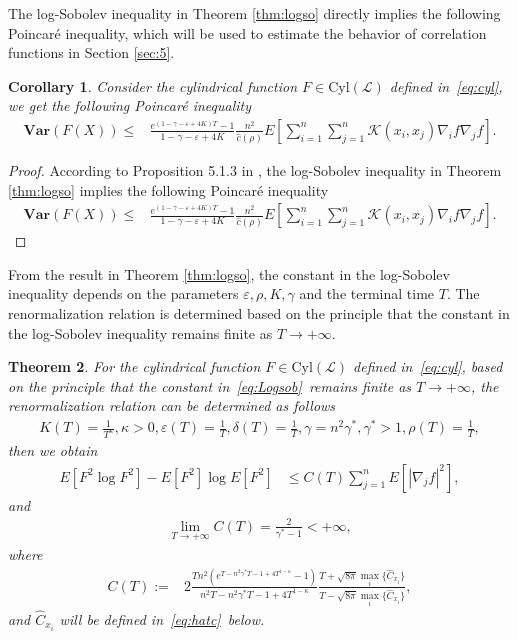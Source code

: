 \documentclass[11pt]{article}
\numberwithin{equation}{section}%
\numberwithin{figure}{section}%
\newtheorem{theorem}{Theorem}[section]
\newtheorem{corollary}[theorem]{Corollary}
\theoremstyle{remark}
\begin{document}
	The log-Sobolev inequality in Theorem \ref{thm:logso} directly implies the following Poincar\'e inequality, which will be used to estimate the behavior of correlation functions in Section \ref{sec:5}.
	\begin{corollary}\label{cor:poinc}
	Consider the cylindrical function $F\in\text{Cyl}(\mathcal{L})$  defined in~\eqref{eq:cyl}, we get the following Poincar\'e inequality
	\begin{align}\label{eq:poin}
		\textbf{Var}(F(X))\leq& \frac{e^{(1-\gamma-\varepsilon+4K)T}-1}{1-\gamma-\varepsilon+4K}\frac{n^{2}}{\hat{c}(\rho)}E\left[\sum_{i=1}^{n}\sum_{j=1}^{n}\mathcal{K}(x_{i},x_{j})\nabla_{i}f\nabla_{j}f\right].
	\end{align}
\end{corollary}
\begin{proof}
	According to Proposition 5.1.3 in \cite{Bakry2014document}, the log-Sobolev inequality in Theorem \ref{thm:logso} implies the following Poincar\'e inequality 
\begin{align*}
	\textbf{Var}(F(X))\leq& \frac{e^{(1-\gamma-\varepsilon+4K)T}-1}{1-\gamma-\varepsilon+4K}\frac{n^{2}}{\hat{c}(\rho)}E\left[\sum_{i=1}^{n}\sum_{j=1}^{n}\mathcal{K}(x_{i},x_{j})\nabla_{i}f\nabla_{j}f\right].
\end{align*}
\end{proof}
From the result in Theorem \ref{thm:logso}, the constant in the log-Sobolev inequality depends on the parameters $\varepsilon,\rho,K,\gamma$ and the terminal time $T$. The renormalization relation is determined based on the  principle that the constant in the log-Sobolev inequality remains finite as $T\rightarrow+\infty$.
	\begin{theorem}\label{thm:4.8}
		For the cylindrical  function $F\in\text{Cyl}(\mathcal{L})$  defined in~\eqref{eq:cyl}, based on the principle that the constant in~\eqref{eq:Logsob}~remains finite as $T\rightarrow+\infty$, the renormalization relation can be determined as follows
		\begin{align}\label{eq:ronrel}
			K(T)=\frac{1}{T^{\kappa}},\kappa>0,\varepsilon(T)=\frac{1}{T},\delta(T)=\frac{1}{T},\gamma=n^{2}\gamma^{*},\gamma^{*}>1, \rho(T)=\frac{1}{T},
		\end{align}
		then we obtain
		\begin{align*}
			E[F^{2}\log F^{2}]-E[F^{2}]\log E[F^{2}]
			&\leq C(T) \sum_{j=1}^nE\left[|\nabla_j f|^{2} \right],
		\end{align*}
				and
		\begin{align*}
				 \lim\limits_{T\rightarrow+\infty}C(T)=\frac{2}{\gamma^{*}-1}<+\infty,
		\end{align*}
		where
		\begin{align*}
			 C(T):=&2\frac{Tn^{2}\left(e^{T-n^{2}\gamma^{*}T-1+4T^{1-\kappa}}-1\right)}{n^{2}T-n^{2}\gamma^{*}T-1+4T^{1-\kappa}}\frac{T+\sqrt{8\pi} \max_{i}\{\hat{C}_{x_{i}}\}}{T-\sqrt{8\pi} \max_{i}\{\hat{C}_{x_{i}}\}},
		\end{align*}
		and $\hat{C}_{x_{i}}$ will be defined in~\eqref{eq:hatc}~below. 
	\end{theorem}
\end{document}
